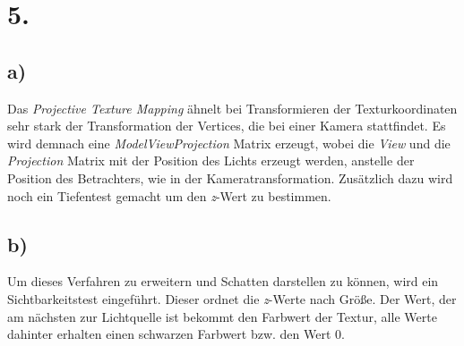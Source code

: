 \documentclass[12pt]{scrreprt}
\begin{document}
\section*{5.}
\subsection*{a)}
Das \emph{Projective Texture Mapping} ähnelt bei Transformieren der Texturkoordinaten sehr stark der Transformation der Vertices, die bei einer Kamera stattfindet. Es wird demnach eine \emph{ModelViewProjection} Matrix erzeugt, wobei die \emph{View} und die \emph{Projection} Matrix mit der Position des Lichts erzeugt werden, anstelle der Position des Betrachters, wie in der Kameratransformation. Zusätzlich dazu wird noch ein Tiefentest gemacht um den \emph{z}-Wert zu bestimmen.
\subsection*{b)}
Um dieses Verfahren zu erweitern und Schatten darstellen zu können, wird ein Sichtbarkeitstest eingeführt. Dieser ordnet die \emph{z}-Werte nach Größe. Der Wert, der am nächsten zur Lichtquelle ist bekommt den Farbwert der Textur, alle Werte dahinter erhalten einen schwarzen Farbwert bzw. den Wert 0.
\end{document}
